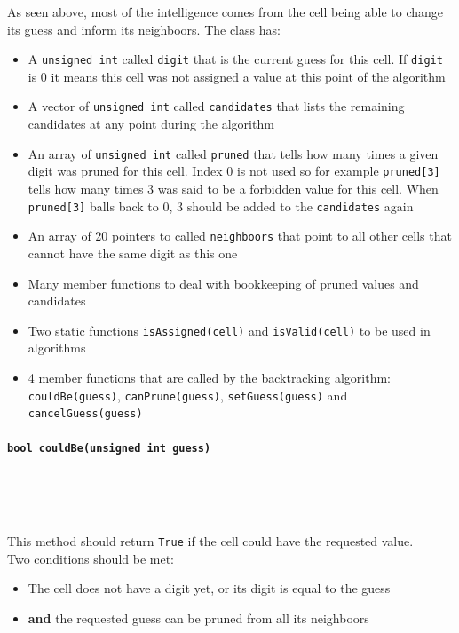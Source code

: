 \documentclass{ecnreport}
\begin{document}
As seen above, most of the intelligence comes from the cell being able to change its guess and inform its neighboors.
The \Cell class has:
\begin{itemize}
 \item A \texttt{unsigned int} called \texttt{digit} that is the current guess for this cell. If \texttt{digit} is 0 it means this cell was not assigned a value at this point of the algorithm
 \item A vector of \texttt{unsigned int} called \texttt{candidates} that lists the remaining candidates at any point during the algorithm
 \item An array of \texttt{unsigned int} called \texttt{pruned} that tells how many times a given digit was pruned for this cell. Index 0 is not used so for example \texttt{pruned[3]} tells how many times 3 was said to be a forbidden value for this cell. When \texttt{pruned[3]} balls back to 0, 3 should be added to the \texttt{candidates} again
 \item An array of 20 pointers to \Cell called \texttt{neighboors} that point to all other cells that cannot have the same digit as this one
 \item Many member functions to deal with bookkeeping of pruned values and candidates
 \item Two static functions \texttt{isAssigned(cell)} and \texttt{isValid(cell)} to be used in algorithms
 \item 4 member functions that are called by the backtracking algorithm: \texttt{couldBe(guess)}, \texttt{canPrune(guess)}, \texttt{setGuess(guess)} and \texttt{cancelGuess(guess)}
\end{itemize}


\paragraph{\bf \texttt{bool couldBe(unsigned int guess)}}~\\

 \begin{minipage}{.5cm}
~
 \end{minipage}
 \begin{minipage}{0.9\linewidth}
    This method should return \texttt{True} if the cell could have the requested value.\\
    Two conditions should be met:

\begin{itemize}
 \item The cell does not have a digit yet, or its digit is equal to the guess
 \item {\bf and} the requested guess can be pruned from all its neighboors
\end{itemize}
 \end{minipage}
\end{document}

